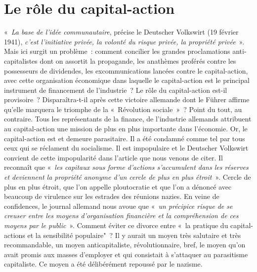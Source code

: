 \documentclass[french,twoside]{book} %
\begin{document}
\section[Le rôle du capital-action]{Le rôle du capital-action}
\noindent « \emph{La base de l’idée communautaire}, précise le Deutscher Volkswirt (19 février 1941), \emph{c’est l’initiative privée, la volonté du risque privée, la propriété privée} ». Mais ici surgit un problème : comment concilier les grandes proclamations anti-capitalistes dont on assortit la propagande, les anathèmes proférés contre les possesseurs de dividendes, les excommunications lancées contre le capital-action, avec cette organisation économique dans laquelle le capital-action est le principal instrument de financement de l’industrie ? Le rôle du capital-action est-il provisoire ? Disparaîtra-t-il après cette victoire allemande dont le Führer affirme qu’elle marquera le triomphe de la « Révolution sociale » ? Point du tout, au contraire. Tous les représentants de la finance, de l’industrie allemands attribuent au capital-action une mission de plus en plus importante dans l’économie. Or, le capital-action est et demeure parasitaire. Il a été condamné comme tel par tous ceux qui se réclament du socialisme. Il est impopulaire et le Deutscher Volkswirt convient de cette impopularité dans l’article que nous venons de citer. Il reconnaît que « \emph{les capitaux sous forme d’actions s’accumulent dans les réserves et deviennent la propriété anonyme d’un cercle de plus en plus étroit} ». Cercle de plus en plus étroit, que l’on appelle ploutocratie et que l’on a dénoncé avec beaucoup de virulence sur les estrades des réunions nazies. En veine de confidences, le journal allemand nous avoue que « \emph{un précipice risque de se creuser entre les moyens d’organisation financière et la compréhension de ces moyens par le public} ». Comment éviter ce divorce entre « la pratique du capital-actions et la sensibilité populaire" ? Il y aurait un moyen très salutaire et très recommandable, un moyen anticapitaliste, révolutionnaire, bref, le moyen qu’on avait promis aux masses d’employer et qui consistait à s’attaquer au parasitisme capitaliste. Ce moyen a été délibérément repoussé par le nazisme.
\end{document}
